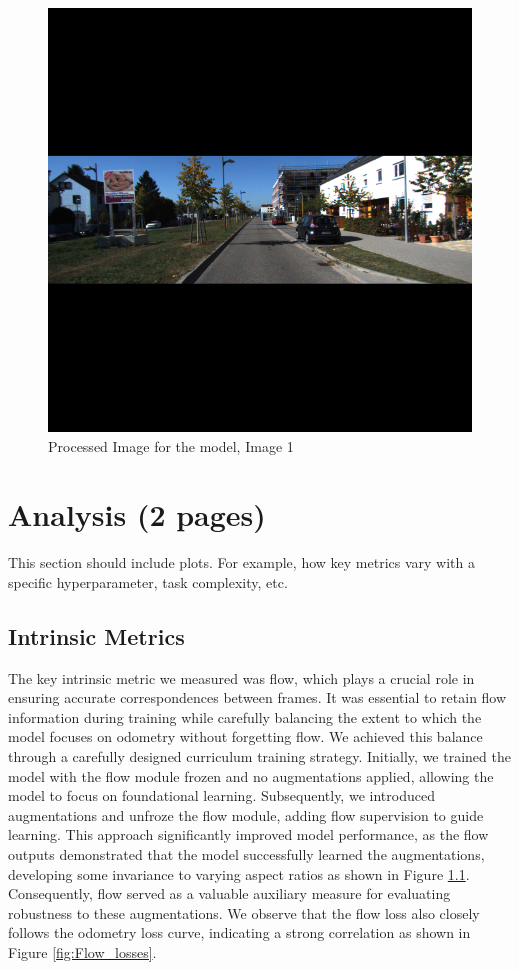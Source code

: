 \documentclass[11pt,a4paper]{article}
\begin{document}
\begin{figure}[t]
    \centering
    \includegraphics[width=1.0\linewidth]{Reports/4-Final-Report/images/results/vol_input-0.png}
    \caption{Processed Image for the model, Image 1}
    \label{fig:kitti-img1}
\end{figure}


\clearpage
\section{Analysis (2 pages)}
This section should include plots.  For example, how key metrics vary with a specific hyperparameter, task complexity, etc.

\subsection{Intrinsic Metrics}
The key intrinsic metric we measured was flow, which plays a crucial role in ensuring accurate correspondences between frames. It was essential to retain flow information during training while carefully balancing the extent to which the model focuses on odometry without forgetting flow. We achieved this balance through a carefully designed curriculum training strategy. Initially, we trained the model with the flow module frozen and no augmentations applied, allowing the model to focus on foundational learning. Subsequently, we introduced augmentations and unfroze the flow module, adding flow supervision to guide learning. This approach significantly improved model performance, as the flow outputs demonstrated that the model successfully learned the augmentations, developing some invariance to varying aspect ratios as shown in Figure \ref{}. Consequently, flow served as a valuable auxiliary measure for evaluating robustness to these augmentations. We observe that the flow loss also closely follows the odometry loss curve, indicating a strong correlation as shown in Figure \ref{fig:Flow_losses}.
\end{document}
